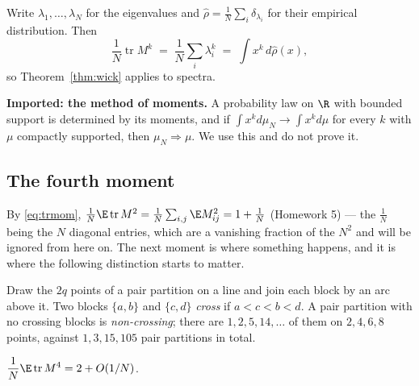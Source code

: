 \documentclass[11pt]{article}
\providecommand{\Tr}{\operatorname{tr}}
\begin{document}
Write $\lambda_1,\dots,\lambda_N$ for the eigenvalues and $\hat\rho=\frac1N\sum_i\delta_{\lambda_i}$ for their empirical distribution. Then
\begin{equation}\label{eq:trmom}
\frac1N\Tr M^k\;=\;\frac1N\sum_i\lambda_i^k\;=\;\int x^k\,d\hat\rho(x),
\end{equation}
so Theorem~\ref{thm:wick} applies to spectra.

\begin{imported}
\textbf{Imported: the method of moments.} A probability law on $\R$ with bounded support is determined by its moments, and if $\int x^kd\mu_N\to\int x^kd\mu$ for every $k$ with $\mu$ compactly supported, then $\mu_N\Rightarrow\mu$. We use this and do not prove it.
\end{imported}

\subsection{The fourth moment}

By \eqref{eq:trmom}, $\frac1N\E\Tr M^2=\frac1N\sum_{i,j}\E M_{ij}^2=1+\frac1N$ (Homework 5) --- the $\frac1N$ being the $N$ diagonal entries, which are a vanishing fraction of the $N^2$ and will be ignored from here on. The next moment is where something happens, and it is where the following distinction starts to matter.

\begin{definition}[Crossing]\label{def:cross}
Draw the $2q$ points of a pair partition on a line and join each block by an arc above it. Two blocks $\{a,b\}$ and $\{c,d\}$ \emph{cross} if $a<c<b<d$. A pair partition with no crossing blocks is \emph{non-crossing}; there are $1,2,5,14,\dots$ of them on $2,4,6,8$ points, against $1,3,15,105$ pair partitions in total.
\end{definition}

\begin{proposition}\label{prop:m4}
$\displaystyle \frac1N\E\Tr M^4=2+O(1/N)$.
\end{proposition}
\end{document}
